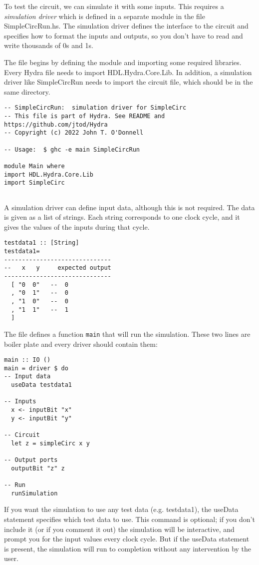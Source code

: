 \documentclass[11pt]{article}
\begin{document}
To test the circuit, we can simulate it with some inputs.  This
requires a \emph{simulation driver} which is defined in a separate module
in the file SimpleCircRun.hs.  The simulation driver defines the
interface to the circuit and specifies how to format the inputs and
outputs, so you don't have to read and write thousands of 0s and 1s.

The file begins by defining the module and importing some required
libraries.  Every Hydra file needs to import HDL.Hydra.Core.Lib.  In
addition, a simulation driver like SimpleCircRun needs to import the
circuit file, which should be in the same directory.

\begin{verbatim}
-- SimpleCircRun:  simulation driver for SimpleCirc
-- This file is part of Hydra. See README and https://github.com/jtod/Hydra
-- Copyright (c) 2022 John T. O'Donnell

-- Usage:  $ ghc -e main SimpleCircRun

module Main where
import HDL.Hydra.Core.Lib
import SimpleCirc


\end{verbatim}

A simulation driver can define input data, although this is not
required.  The data is given as a list of strings.  Each string
corresponds to one clock cycle, and it gives the values of the inputs
during that cycle.

\begin{verbatim}
testdata1 :: [String]
testdata1=
------------------------------
--   x   y     expected output
------------------------------
  [ "0  0"   --  0
  , "0  1"   --  0
  , "1  0"   --  0
  , "1  1"   --  1
  ]
\end{verbatim}

The file defines a function \texttt{main} that will run the simulation.
These two lines are boiler plate and every driver should contain them:

\begin{verbatim}
main :: IO ()
main = driver $ do
-- Input data
  useData testdata1

-- Inputs
  x <- inputBit "x"
  y <- inputBit "y"

-- Circuit
  let z = simpleCirc x y

-- Output ports
  outputBit "z" z

-- Run
  runSimulation
\end{verbatim}

If you want the simulation to use any test data (e.g. testdata1), the
useData statement specifies which test data to use.  This command is
optional; if you don't include it (or if you comment it out) the
simulation will be interactive, and prompt you for the input values
every clock cycle.  But if the useData statement is present, the
simulation will run to completion without any intervention by the
user.
\end{document}
